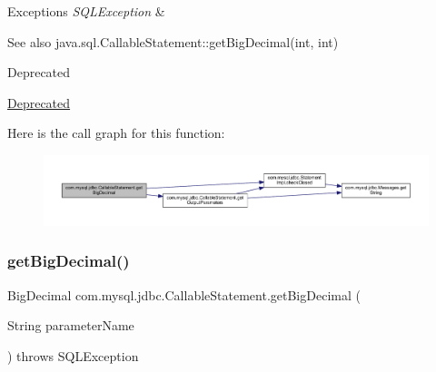 \begin{DoxyExceptions}{Exceptions}
{\em S\+Q\+L\+Exception} & \\
\hline
\end{DoxyExceptions}
\begin{DoxySeeAlso}{See also}
java.\+sql.\+Callable\+Statement\+::get\+Big\+Decimal(int, int) 
\end{DoxySeeAlso}
\begin{DoxyRefDesc}{Deprecated}
\item[\mbox{\hyperlink{deprecated__deprecated000005}{Deprecated}}]\end{DoxyRefDesc}
Here is the call graph for this function\+:\nopagebreak
\begin{figure}[H]
\begin{center}
\leavevmode
\includegraphics[width=350pt]{classcom_1_1mysql_1_1jdbc_1_1_callable_statement_a0880f0927e476429020989dc3dd5b9ab_cgraph}
\end{center}
\end{figure}
\mbox{\label{classcom_1_1mysql_1_1jdbc_1_1_callable_statement_a987a3ccf4e6222eaf783b2b5733c5c9b}} 
\subsubsection{\texorpdfstring{get\+Big\+Decimal()}{getBigDecimal()}\hspace{0.1cm}{\footnotesize\ttfamily [3/3]}}
{\footnotesize\ttfamily Big\+Decimal com.\+mysql.\+jdbc.\+Callable\+Statement.\+get\+Big\+Decimal (\begin{DoxyParamCaption}\item[{String}]{parameter\+Name }\end{DoxyParamCaption}) throws S\+Q\+L\+Exception}

